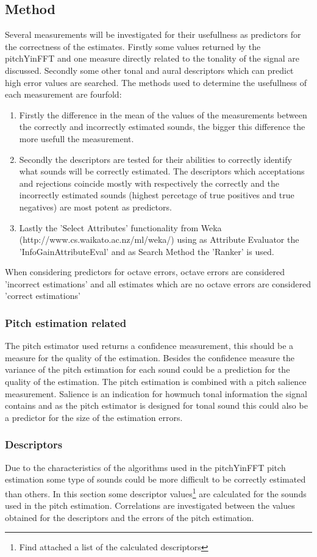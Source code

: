 \documentclass{article}
\begin{document}
\subsection{Method}
Several measurements will be investigated for their usefullness as predictors for the correctness of the estimates. Firstly some values returned by the pitchYinFFT and one measure directly related to the tonality of the signal are discussed. Secondly some other tonal and aural descriptors which can predict high error values are searched. The methods used to determine the usefullness of each measurement are fourfold:
\begin{enumerate}
    \item Firstly the difference in the mean of the values of the measurements between the correctly and incorrectly estimated sounds, the bigger this difference the more usefull the measurement. 
    \item Secondly the descriptors are tested for their abilities to correctly identify what sounds will be correctly estimated. The descriptors which acceptations and rejections coincide mostly with respectively the correctly and the incorrectly estimated sounds (highest percetage of true positives and true negatives) are most potent as predictors. 
    \item Lastly the 'Select Attributes' functionality from Weka (http://www.cs.waikato.ac.nz/ml/weka/) using as Attribute Evaluator the 'InfoGainAttributeEval' and as Search Method the 'Ranker' is used.
\end{enumerate}
When considering predictors for octave errors, octave errors are considered 'incorrect estimations' and all estimates which are no octave errors are considered 'correct estimations'

\subsubsection{Pitch estimation related}
The pitch estimator used returns a confidence measurement, this should be a measure for the quality of the estimation. Besides the confidence measure the variance of the pitch estimation for each sound could be a prediction for the quality of the estimation. The pitch estimation is combined with a pitch salience measurement. Salience is an indication for howmuch tonal information the signal contains and as the pitch estimator is designed for tonal sound this could also be a predictor for the size of the estimation errors.

\subsubsection{Descriptors}
Due to the characteristics of the algorithms used in the pitchYinFFT pitch estimation some type of sounds could be more difficult to be correctly estimated than others. In this section some descriptor values\footnote{Find attached a list of the calculated descriptors} are calculated for the sounds used in the pitch estimation. Correlations are investigated between the values obtained for the descriptors and the errors of the pitch estimation. 
\end{document}
